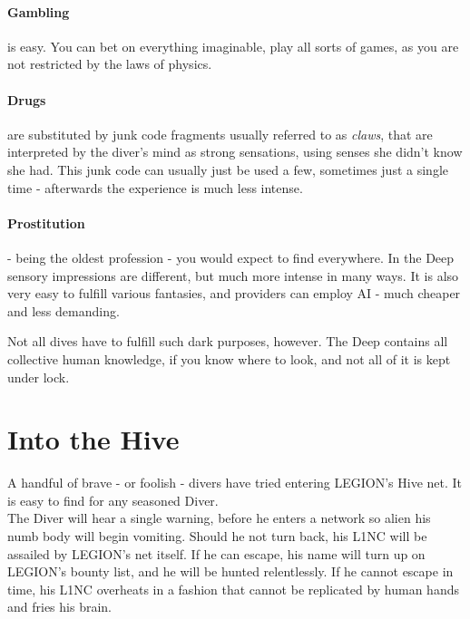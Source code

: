 \paragraph{Gambling} is easy.
You can bet on everything imaginable, play all sorts of games, as you are not restricted by the laws of physics.
\paragraph{Drugs} are substituted by junk code fragments usually referred to as \emph{claws},
	that are interpreted by the diver's mind as strong sensations, using senses she didn't know she had.
This junk code can usually just be used a few, sometimes just a single time
- afterwards the experience is much less intense.
\paragraph{Prostitution} - being the oldest profession - you would expect to find everywhere.
In the Deep sensory impressions are different, but much more intense in many ways.
It is also very easy to fulfill various fantasies, and providers can employ AI - much cheaper and less demanding.
\par%
Not all dives have to fulfill such dark purposes, however.
The Deep contains all collective human knowledge, if you know where to look, and not all of it is kept under lock.

\section{Into the Hive}
A handful of brave - or foolish - divers have tried entering LEGION's Hive net.
It is easy to find for any seasoned Diver.
\\%
The Diver will hear a single warning, before he enters a network so alien his numb body will begin vomiting.
Should he not turn back, his L1NC will be assailed by LEGION's net itself.
If he can escape, his name will turn up on LEGION's bounty list, and he will be hunted relentlessly.
If he cannot escape in time, his L1NC overheats in a fashion that cannot be replicated by human hands and fries his brain.
